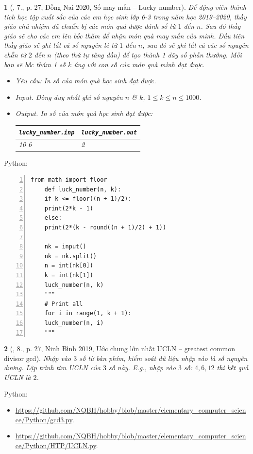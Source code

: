 \documentclass{article}
\newtheorem{baitoan}{}
\begin{document}
\begin{baitoan}[\cite{VietSTEM2021}, 7., p. 27, Đồng Nai 2020, Số may mắn -- Lucky number]
	Để động viên thành tích học tập xuất sắc của các em học sinh lớp 6-3 trong năm học 2019--2020, thầy giáo chủ nhiệm đã chuẩn bị các món quà được đánh số từ $1$ đến $n$. Sau đó thầy giáo sẽ cho các em lên bốc thăm để nhận món quà may mắn của mình. Đầu tiên thầy giáo sẽ ghi tất cả số nguyên lẻ từ $1$ đến $n$, sau đó sẽ ghi tất cả các số nguyên chẵn từ $2$ đến $n$ (theo thứ tự tăng dần) để tạo thành 1 dãy số phần thưởng. Mỗi bạn sẽ bốc thăm 1 số $k$ ứng với con số của món quà mình đạt được.
	\begin{itemize}
		\item {\sf Yêu cầu:} In số của món quà học sinh đạt được.
		\item {\sf Input.} Dòng duy nhất ghi số nguyên $n$ \& $k$, $1\le k\le n\le1000$.
		\item {\sf Output.} In số của món quà học sinh đạt được:
		\begin{table}[H]
			\centering
			\begin{tabular}{|l|l|}
				\hline
				\verb|lucky_number.inp| & \verb|lucky_number.out| \\
				\hline
				10 6 & 2 \\
				\hline
			\end{tabular}
		\end{table}
	\end{itemize}
\end{baitoan}
Python:
\begin{Verbatim}[numbers=left,xleftmargin=5mm]
	from math import floor
	def luck_number(n, k):
	if k <= floor((n + 1)/2):
	print(2*k - 1)
	else:
	print(2*(k - round((n + 1)/2) + 1))
	
	nk = input()
	nk = nk.split()
	n = int(nk[0])
	k = int(nk[1])
	luck_number(n, k)
	"""
	# Print all
	for i in range(1, k + 1):
	luck_number(n, i)
	"""
\end{Verbatim}

\begin{baitoan}[\cite{VietSTEM2021}, 8., p. 27, Ninh Bình 2019, Ước chung lớn nhất ƯCLN -- greatest common divisor gcd]
	Nhập vào $3$ số từ bàn phím, kiểm soát dữ liệu nhập vào là số nguyên dương. Lập trình tìm \emph{ƯCLN} của $3$ số này. E.g., nhập vào $3$ số: $4,6,12$ thì kết quả \emph{ƯCLN} là $2$.
\end{baitoan}
Python:
\begin{itemize}
	\item \url{https://github.com/NQBH/hobby/blob/master/elementary_computer_science/Python/gcd3.py}.
	\item \url{https://github.com/NQBH/hobby/blob/master/elementary_computer_science/Python/HTP/UCLN.py}.
\end{itemize}
\end{document}
